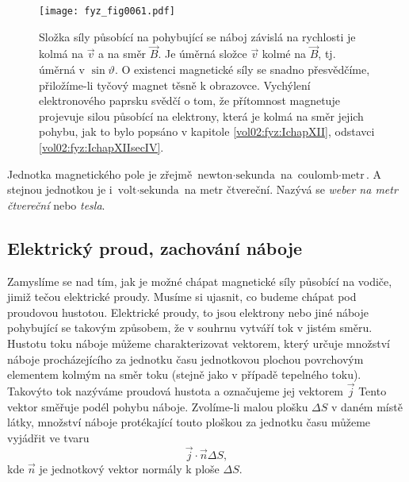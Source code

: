     \begin{figure}[ht!]  %
      \centering
      \texttt{[image: fyz\_fig0061.pdf]}
      \caption{Složka síly působící na pohybující se náboj závislá na rychlosti je kolmá na 
               \(\vec{v}\) a na směr \(\vec{B}\). Je úměrná složce \(\vec{v}\) kolmé na 
               \(\vec{B}\), tj. úměrná v \(\sin\vartheta\). O existenci magnetické síly se snadno 
                přesvědčíme, přiložíme-li tyčový magnet těsně k obrazovce. Vychýlení elektronového 
                paprsku svědčí o tom, že přítomnost magnetuje projevuje silou působící na 
                elektrony, která je kolmá na směr jejich pohybu, jak to bylo popsáno v kapitole 
                \ref{vol02:fyz:IchapXII}, odstavci \ref{vol02:fyz:IchapXIIsecIV}.
                \cite[s.~225]{Feynman02}}
      \label{fyz:fig0061}
    \end{figure}
    
    Jednotka magnetického pole je zřejmě \(\text{newton}\cdot\text{sekunda}\) na \(\text{coulomb} 
    \cdot \text{metr}\). A stejnou jednotkou je i \(\text{volt}\cdot\text{sekunda}\) na metr 
    čtvereční. Nazývá se \emph{weber na metr čtvereční} nebo \emph{tesla}.

    \subsection{Elektrický proud, zachování náboje}
      \cite[s.~225]{Feynman02} Zamyslíme se nad tím, jak je možné chápat magnetické síly působící 
      na vodiče, jimiž tečou elektrické proudy. Musíme si ujasnit, co budeme chápat pod proudovou 
      hustotou. Elektrické proudy, to jsou elektrony nebo jiné náboje pohybující se takovým 
      způsobem, že v souhrnu vytváří tok v jistém směru. Hustotu toku náboje můžeme charakterizovat 
      vektorem, který určuje množství náboje procházejícího za jednotku času jednotkovou plochou 
      povrchovým elementem kolmým na směr toku (stejně jako v případě tepelného toku). Takovýto tok 
      nazýváme proudová hustota a označujeme jej vektorem \(\vec{j}\) Tento vektor směřuje podél 
      pohybu náboje. Zvolíme-li malou plošku \(\Delta S\) v daném místě látky, množství náboje 
      protékající touto ploškou za jednotku času můžeme vyjádřit ve tvaru
      \begin{equation}\label{eq_fyz:mag001}
        \vec{j}\cdot\vec{n}\Delta S,
      \end{equation} 
      kde \(\vec{n}\) je jednotkový vektor normály k ploše \(\Delta S\).
      
